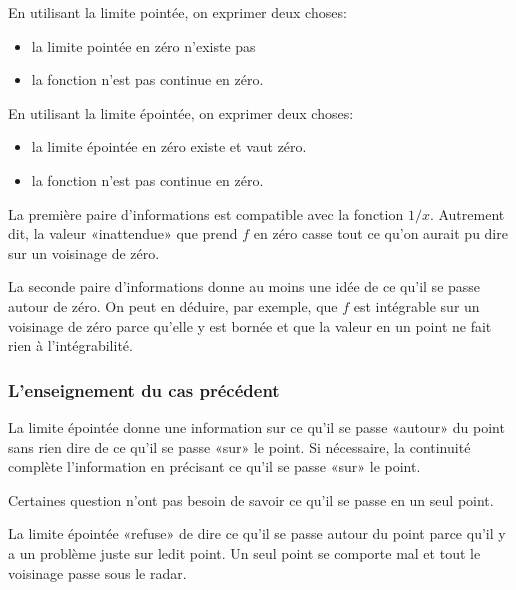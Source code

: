 En utilisant la limite pointée, on exprimer deux choses:
\begin{itemize}
	\item la limite pointée en zéro n'existe pas
	\item la fonction n'est pas continue en zéro.
\end{itemize}

En utilisant la limite épointée, on exprimer deux choses:
\begin{itemize}
	\item la limite épointée en zéro existe et vaut zéro.
	\item la fonction n'est pas continue en zéro.
\end{itemize}

La première paire d'informations est compatible avec la fonction \( 1/x\). Autrement dit, la valeur «inattendue» que prend \( f\) en zéro casse tout ce qu'on aurait pu dire sur un voisinage de zéro.

La seconde paire d'informations donne au moins une idée de ce qu'il se passe autour de zéro. On peut en déduire, par exemple, que \( f\) est intégrable sur un voisinage de zéro parce qu'elle y est bornée et que la valeur en un point ne fait rien à l'intégrabilité.

\subsubsection{L'enseignement du cas précédent}

La limite épointée donne une information sur ce qu'il se passe «autour» du point sans rien dire de ce qu'il se passe «sur» le point. Si nécessaire, la continuité complète l'information en précisant ce qu'il se passe «sur» le point.

Certaines question n'ont pas besoin de savoir ce qu'il se passe en un seul point.

La limite épointée «refuse» de dire ce qu'il se passe autour du point parce qu'il y a un problème juste sur ledit point. Un seul point se comporte mal et tout le voisinage passe sous le radar.

